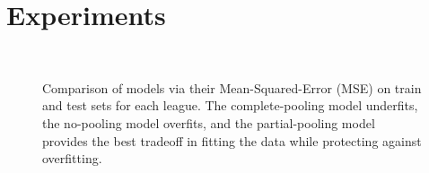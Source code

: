 \section{Experiments}

\begin{figure}
	 \\
	\caption{Comparison of models via their Mean-Squared-Error (MSE) on train and test sets for each league. The complete-pooling model underfits, the no-pooling model overfits, and the partial-pooling model provides the best tradeoff in fitting the data while protecting against overfitting.}
	\label{fig:mses}
\end{figure}

